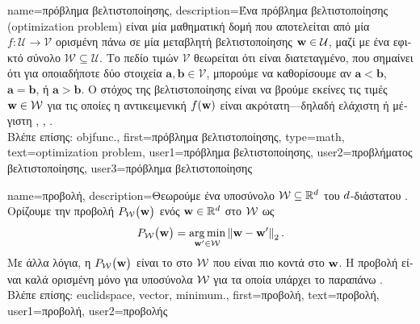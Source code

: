 {name={\foreignlanguage{greek}{πρόβλημα βελτιστοποίησης}}, 
	description={\foreignlanguage{greek}{Ένα πρόβλημα βελτιστοποίησης} 
		(optimization problem) \foreignlanguage{greek}{είναι μία μαθηματική δομή που αποτελείται από μία}  
		$f: \mathcal{U} \rightarrow \mathcal{V}$ \foreignlanguage{greek}{ορισμένη πάνω σε μία μεταβλητή βελτιστοποίησης 
		${\bf w} \in \mathcal{U}$, μαζί με ένα εφικτό σύνολο $\mathcal{W} \subseteq \mathcal{U}$. Το 
		πεδίο τιμών $\mathcal{V}$ θεωρείται ότι είναι διατεταγμένο, που σημαίνει ότι για οποιαδήποτε δύο στοιχεία 
		$\mathbf{a}, \mathbf{b} \in \mathcal{V}$, μπορούμε να καθορίσουμε αν $\mathbf{a} < \mathbf{b}$, $\mathbf{a} = \mathbf{b}$, 
		ή $\mathbf{a} > \mathbf{b}$. Ο στόχος της βελτιστοποίησης είναι να βρούμε εκείνες τις τιμές ${\bf w} \in \mathcal{W}$ 
		για τις οποίες η αντικειμενική $f({\bf w})$ είναι ακρότατη—δηλαδή ελάχιστη ή μέγιστη} 
		\cite{BertsekasNonLinProgr}, \cite{BoydConvexBook}, \cite{nesterov04}.\\
		\foreignlanguage{greek}{Βλέπε επίσης:} \gls{objfunc}.},
	first={\foreignlanguage{greek}{πρόβλημα βελτιστοποίησης}},
	type=math,
	text={optimization problem},
	user1={\foreignlanguage{greek}{πρόβλημα βελτιστοποίησης}}, %
  	user2={\foreignlanguage{greek}{προβλήματος βελτιστο\-ποί\-ησης}}, %
	user3={\foreignlanguage{greek}{πρόβλημα βελτιστοποίησης}} %
}

 {name={\foreignlanguage{greek}{προβολή}}, 
       description={\foreignlanguage{greek}{Θεωρούμε ένα υποσύνολο} 
       		$\mathcal{W} \subseteq \mathbb{R}^{d}$ \foreignlanguage{greek}{του $d$-διάστατου} 
		. \foreignlanguage{greek}{Ορίζουμε την προβολή $P_{\mathcal{W}}\big( {\bf w}\big)$ 
		ενός}  ${\bf w} \in \mathbb{R}^{d}$ \foreignlanguage{greek}{στο $\mathcal{W}$ ως}
		\begin{equation} 
   	    		\nonumber
			\label{equ_def_proj_generic_dict}
  	     		P_{\mathcal{W}}\big( {\bf w}\big) = \operatorname*{arg\,min}_{{\bf w}' \in \mathcal{W}} \left\Vert {{\bf w}- {\bf w}'} \right\Vert_{2}. 
         	\end{equation}
		 \foreignlanguage{greek}{Με άλλα λόγια, η $P_{\mathcal{W}}\big( {\bf w}\big)$ είναι το}  
		 \foreignlanguage{greek}{στο $\mathcal{W}$ που είναι πιο κοντά στο ${\bf w}$. Η προβολή είναι καλά ορισμένη μόνο 
		 για υποσύνολα $\mathcal{W}$ για τα οποία υπάρχει το παραπάνω}  \cite{BoydConvexBook}.\\
		 \foreignlanguage{greek}{Βλέπε επίσης:} \gls{euclidspace}, \gls{vector}, \gls{minimum}.},
	first={\foreignlanguage{greek}{προβολή}},
	text={\foreignlanguage{greek}{προβολή}},
	user1={\foreignlanguage{greek}{προβολή}}, %
	user2={\foreignlanguage{greek}{προβολής}} %
}


